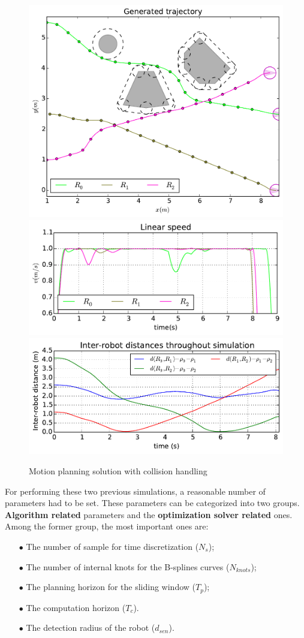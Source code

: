 \begin{figure}\centering
  \includegraphics[width=.65\linewidth]{./images/no_collision/new/multirobot-path.pdf} 
  \\[1mm]
  \includegraphics[width=.65\linewidth]{./images/no_collision/new/multirobot-vw.pdf} %
  \includegraphics[width=.65\linewidth]{./images/no_collision/new/multirobot-interr.pdf} %
  \caption{Motion planning solution with collision handling\label{fig:nocollision}}
\label{fig:res}
\end{figure}

For performing these two previous simulations, a reasonable number of parameters had to be set. These parameters can be categorized into two groups. \textbf{Algorithm related} parameters and the \textbf{optimization solver related} ones.
Among the former group, the most important ones are:
\begin{itemize}
\item[$\bullet$] The number of sample for time discretization ($N_s$);
\item[$\bullet$] The number of internal knots for the B-splines curves ($N_{knots}$);
\item[$\bullet$] The planning horizon for the sliding window ($T_p$);
\item[$\bullet$] The computation horizon ($T_c$).
\item[$\bullet$] The detection radius of the robot ($d_{sen}$).
\end{itemize}

